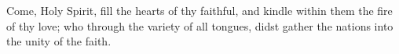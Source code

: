\begin{enpars}\noindent Come, Holy Spirit,
fill the hearts of thy faithful,
and kindle within them the fire of thy love;
who through the variety of all tongues,
didst gather the nations into the unity of the
faith.\end{enpars}